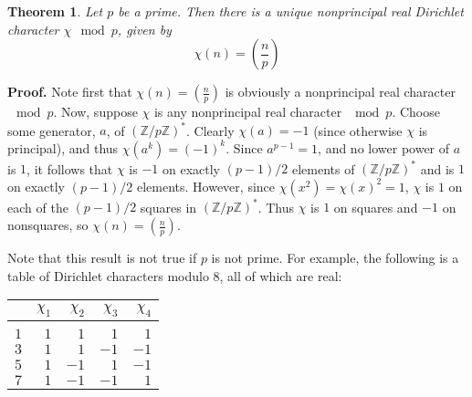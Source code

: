 \documentclass[12pt]{article}
\newcommand{\Ints}{\mathbb{Z}}
\newcommand{\Leg}[2]{\left(\frac{#1}{#2}\right)}
\newtheorem{thm}{Theorem}
\begin{document}
\begin{thm} Let $p$ be a prime. Then there is a unique nonprincipal real Dirichlet character $\chi \mod p$, given by
\[\chi(n)=\Leg{n}{p}\]
\end{thm}
\textbf{Proof. }
Note first that $\chi(n)=\Leg{n}{p}$ is obviously a nonprincipal real character $\mod p$. Now, suppose $\chi$ is any nonprincipal real character $\mod p$. Choose some generator, $a$, of $(\Ints/p\Ints)^*$. Clearly $\chi(a)=-1$ (since otherwise $\chi$ is principal), and thus $\chi(a^k)=(-1)^k$. Since $a^{p-1}=1$, and no lower power of $a$ is $1$, it follows that $\chi$ is $-1$ on exactly $(p-1)/2$ elements of $(\Ints/p\Ints)^*$ and is $1$ on exactly $(p-1)/2$ elements. However, since $\chi(x^2)=\chi(x)^2=1$, $\chi$ is $1$ on each of the $(p-1)/2$ squares in $(\Ints/p\Ints)^*$. Thus $\chi$ is $1$ on squares and $-1$ on nonsquares, so $\chi(n)=\Leg{n}{p}$.

Note that this result is not true if $p$ is not prime. For example, the following is a table of Dirichlet characters modulo $8$, all of which are real:
\begin{center}
\begin{tabular}{c|rrrr}
&$\chi_1$&$\chi_2$&$\chi_3$&$\chi_4$\\
\hline\\
$1$&$1$&$1$&$1$&$1$\\
$3$&$1$&$1$&$-1$&$-1$\\
$5$&$1$&$-1$&$1$&$-1$\\
$7$&$1$&$-1$&$-1$&$1$
\end{tabular}
\end{center}

\end{document}
